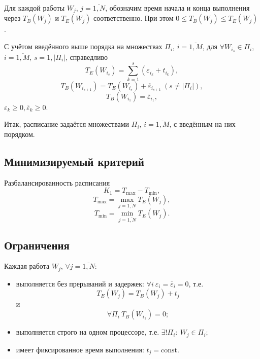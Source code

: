 \documentclass[12pt]{article}
\begin{document}
Для каждой работы $W_j$, $j = \overline{1, N}$, обозначим время начала и конца
выполнения через $T_B(W_j)$ и $T_E(W_j)$ соответственно.
При этом $0 \leq T_B(W_j) \leq T_E(W_j)$.

С учётом введённого выше порядка на множествах $\Pi_i$, $i = \overline{1, M}$,
для $\forall W_{i_s} \in \Pi_i$,
$i = \overline{1, M}$, $s = \overline{1, |\Pi_i|}$, справедливо
\begin{equation}
    T_E(W_{i_s}) = \sum\limits_{k=1}^s (\varepsilon_{i_k} + t_{i_k}),
\end{equation}
\begin{equation}
    T_B(W_{i_{s + 1}}) = T_E(W_{i_s}) + \overline\varepsilon_{i_{s+1}}~
    (s \neq |\Pi_i|),
\end{equation}
\begin{equation}
    T_B(W_{i_1}) = \overline\varepsilon_{i_1},
\end{equation}
$\varepsilon_k \geq 0, \overline\varepsilon_k \geq 0$.

Итак, расписание задаётся множествами $\Pi_i$, $i = \overline{1, M}$,
с введённым на них порядком.

\subsection*{Минимизируемый критерий}
\label{crit}
Разбалансированность расписания
\begin{equation}
    K_1 = T_{\max} - T_{\min},
\end{equation}
\begin{equation}
    T_{\max} = \max_{j = \overline{1, N}} T_E(W_j),
\end{equation}
\begin{equation}
    T_{\min} = \min_{j = \overline{1, N}} T_E(W_j).
\end{equation}

\subsection*{Ограничения}
Каждая работа $W_j$, $\forall j = \overline{1, N}$:
\begin{itemize}
    \item выполняется без прерываний и задержек:
    $\forall i~\varepsilon_i = \overline\varepsilon_i = 0$, т.е.
    \begin{equation}
        T_E(W_j) = T_B(W_j) + t_j
    \end{equation}
    и
    \begin{equation}
        \forall \Pi_i~T_B(W_{i_1}) = 0;
    \end{equation}

    \item выполняется строго на одном процессоре, т.е.
    $\exists! \Pi_i:~W_j \in \Pi_i;$

    \item имеет фиксированное время выполнения: $t_j = \text{const}$.
\end{itemize}
\end{document}

